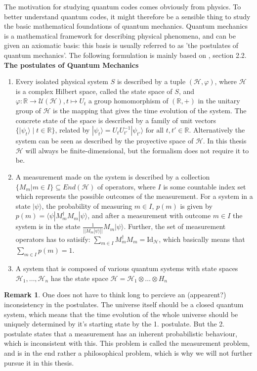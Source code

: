 \documentclass{article}
\def\R{\mathbb{R}}
\def\U{\mathcal{U}}
\def\fa{\text{ for all }}
\def\Id{\text{Id}}
\def\H{\mathcal{H}}
\theoremstyle{definition}
\newtheorem{rem}[Satz]{Remark}
\begin{document}
The motivation for studying quantum codes comes obviously from physics. To better understand quantum codes, it might therefore be a sensible thing to study the basic mathematical foundations of quantum mechanics. 
Quantum mechanics is a mathematical framework for describing physical phenomena, and can be given an axiomatic basis: this basis is usually referred to as 'the postulates of quantum mechanics'. The following formulation is mainly based on \cite{NC}, section 2.2. 
\\ \textbf{The postulates of Quantum Mechanics} \\
\begin{enumerate}
\item Every isolated physical system $S$ is described by a tuple $(\H, \varphi)$, where $\H$ is a complex Hilbert space, called the state space of $S$, and $\varphi: \R \rightarrow \U(\H), t \mapsto U_t$ a group homomorphism of $(\R, +)$ in the unitary group of $\H$ is the mapping that gives the time evolution of the system. The concrete state of the space is described by a family of unit vectors $\{ | \psi_t \rangle \mid t \in \R \}$, related by $| \psi_t \rangle = U_t U_{t'}^{-1} | \psi_{t'} \rangle \fa t,t' \in \R$. Alternatively the system can be seen as described by the proyective space of $\H$. In this thesis $\H$ will always be finite-dimensional, but the formalism does not require it to be.
\item A measurement made on the system is described by a collection $\{ M_m | m \in I \} \subseteq End(\H)$ of operators, where $I$ is some countable index set which represents the possible outcomes of the measurement. For a system in a state $| \psi \rangle$, the probability of measuring $m \in I$, $p(m)$ is given by $p(m) = \langle \psi | M_m^\dagger M_m | \psi \rangle$, and after a measurement with outcome $m \in I$ the system is in the state $\frac{1}{|| M_m | \psi \rangle ||} M_m | \psi \rangle$. Further, the set of measurement operators has to satisify: $\sum_{m \in I} M_m^\dagger M_m = \Id_\H$, which basically means that $\sum_{m \in I} p(m) = 1$.
\item A system that is composed of various quantum systems with state spaces $\H_1, \ldots, \H_n$ has the state space $\H = \H_1 \otimes \ldots \otimes H_n$
\end{enumerate}

\begin{rem}
One does not have to think long to percieve an (appearent?) inconsistency in the postulates. The universe itself should be a closed quantum system, which means that the time evolution of the whole universe should be uniquely determined by it's starting state by the 1. postulate. But the 2. postulate states that a measurement has an inherent probabilistic behaviour, which is inconsistent with this. This problem is called the measurement problem, and is in the end rather a philosophical problem, which is why we will not further pursue it in this thesis.
\end{rem}
\end{document}
